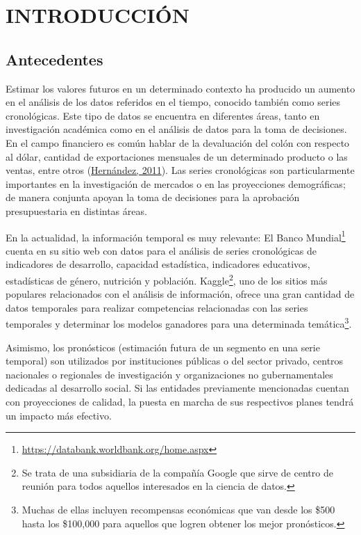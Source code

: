 \documentclass[
]{article}
\begin{document}
\newpage

\section{INTRODUCCIÓN}

\subsection{Antecedentes}

Estimar los valores futuros en un determinado contexto ha producido un
aumento en el análisis de los datos referidos en el tiempo, conocido
también como series cronológicas. Este tipo de datos se encuentra en
diferentes áreas, tanto en investigación académica como en el análisis
de datos para la toma de decisiones. En el campo financiero es común
hablar de la devaluación del colón con respecto al dólar, cantidad de
exportaciones mensuales de un determinado producto o las ventas, entre
otros (\protect\hyperlink{ref-oscarh-1}{Hernández, 2011}). Las series
cronológicas son particularmente importantes en la investigación de
mercados o en las proyecciones demográficas; de manera conjunta apoyan
la toma de decisiones para la aprobación presupuestaria en distintas
áreas.

En la actualidad, la información temporal es muy relevante: El Banco
Mundial\footnote{\url{https://databank.worldbank.org/home.aspx}} cuenta
en su sitio web con datos para el análisis de series cronológicas de
indicadores de desarrollo, capacidad estadística, indicadores
educativos, estadísticas de género, nutrición y población.
Kaggle\footnote{Se trata de una subsidiaria de la compañía Google que
  sirve de centro de reunión para todos aquellos interesados en la
  ciencia de datos.}, uno de los sitios más populares relacionados con
el análisis de información, ofrece una gran cantidad de datos temporales
para realizar competencias relacionadas con las series temporales y
determinar los modelos ganadores para una determinada
temática\footnote{Muchas de ellas incluyen recompensas económicas que
  van desde los \$500 hasta los \$100,000 para aquellos que logren
  obtener los mejor pronósticos.}.

Asimismo, los pronósticos (estimación futura de un segmento en una serie
temporal) son utilizados por instituciones públicas o del sector
privado, centros nacionales o regionales de investigación y
organizaciones no gubernamentales dedicadas al desarrollo social. Si las
entidades previamente mencionadas cuentan con proyecciones de calidad,
la puesta en marcha de sus respectivos planes tendrá un impacto más
efectivo.
\end{document}
